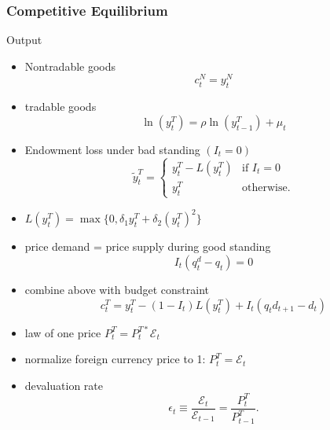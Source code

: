 \documentclass[mathserif]{beamer}
\begin{document}
    \begin{frame}[allowframebreaks]
        \frametitle{Competitive Equilibrium}
        Output
        \begin{itemize}
            \item Nontradable goods
            \begin{equation}
                c^N_t = y^N_t
            \end{equation}
            \item tradable goods
                \begin{equation}
                    \label{eq:ar1-output}
                    \ln(y_t^T) = \rho \ln(y^T_{t-1}) + \mu_t
                \end{equation}
            \item Endowment loss under bad standing $(I_t= 0)$
                \begin{equation}
                    \label{eq:ytt}
                    \tilde{y}^T_t =
                        \begin{cases}
                        y^T_t  - L(y^T_t) & \text{if } I_t = 0 \\
                        y^T_t & \text{otherwise.}
                        \end{cases}
                \end{equation}
            \item $L(y^T_t) = \max \{0, \delta_1 y^T_t + \delta_2 (y^T_t)^2\}$
                \framebreak
            \item price demand = price supply during good standing
                \begin{equation}
                    \label{eq:qq}
                    I_t(q^d_t - q_t) = 0
                \end{equation}
            \item combine above with budget constraint
                \begin{equation}
                    \label{eq:market-clearing}
                    c^T_t = y^T_t - (1 - I_t)L(y^T_t) + I_t(q_t d_{t+1} - d_t)
                \end{equation}
                \framebreak
            \item law of one price $P^T_t = P^{T*}_t \mathcal{E}_t$
            \item normalize foreign currency price to 1: $P^T_t = \mathcal{E}_t$
            \item devaluation rate
                \begin{equation}
                    \label{eq:devaluation-rate}
                    \epsilon_t \equiv \frac{\mathcal{E}_t}{\mathcal{E}_{t-1}} = \frac{P^T_t}{P^T_{t-1}}.
                \end{equation}
            \end{itemize}
    \end{frame}
\end{document}
